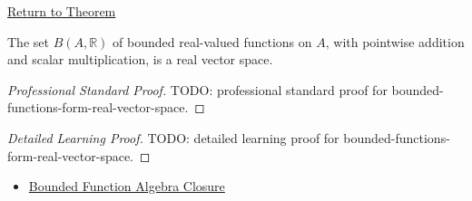 \newpage
{}
\label{prf:bounded-functions-form-real-vector-space}

\begin{remark*}[Return]
\hyperref[thm:bounded-functions-form-real-vector-space]{Return to Theorem}
\end{remark*}

\begin{theorem*}
The set \(B(A,\mathbb{R})\) of bounded real-valued functions on \(A\), with
pointwise addition and scalar multiplication, is a real vector space.
\end{theorem*}

\begin{proof}[Professional Standard Proof]
\LRAProofBodyStart
TODO: professional standard proof for bounded-functions-form-real-vector-space.
\end{proof}

\begin{proof}[Detailed Learning Proof]
\LRAProofBodyStart
TODO: detailed learning proof for bounded-functions-form-real-vector-space.
\end{proof}

\begin{remark*}
\end{remark*}

\begin{dependencies}
\begin{itemize}
  \item \hyperref[thm:bounded-function-algebra-closure]{Bounded Function Algebra Closure}
\end{itemize}
\end{dependencies}

\clearpage
